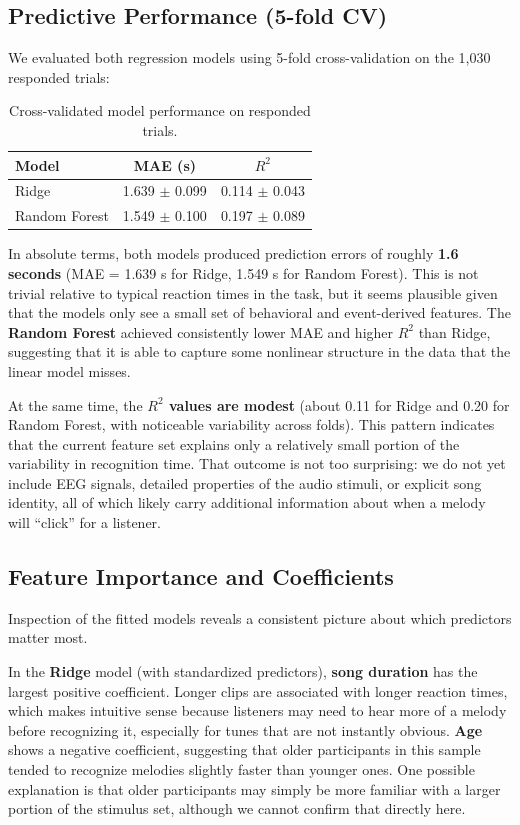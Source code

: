 \documentclass[11pt,a4paper]{article}
\begin{document}
\subsection{Predictive Performance (5-fold CV)}

We evaluated both regression models using 5-fold cross-validation on the 1,030 responded trials:

\begin{table}[h!]
\centering
\begin{tabular}{lcc}
\toprule
\textbf{Model} & \textbf{MAE (s)} & \textbf{$R^2$} \\
\midrule
Ridge & 1.639 $\pm$ 0.099 & 0.114 $\pm$ 0.043 \\
Random Forest & 1.549 $\pm$ 0.100 & 0.197 $\pm$ 0.089 \\
\bottomrule
\end{tabular}
\caption{Cross-validated model performance on responded trials.}
\end{table}

In absolute terms, both models produced prediction errors of roughly \textbf{1.6 seconds} (MAE = 1.639 s for Ridge, 1.549 s for Random Forest). This is not trivial relative to typical reaction times in the task, but it seems plausible given that the models only see a small set of behavioral and event-derived features. The \textbf{Random Forest} achieved consistently lower MAE and higher $R^2$ than Ridge, suggesting that it is able to capture some nonlinear structure in the data that the linear model misses.

At the same time, the \textbf{$R^2$ values are modest} (about 0.11 for Ridge and 0.20 for Random Forest, with noticeable variability across folds). This pattern indicates that the current feature set explains only a relatively small portion of the variability in recognition time. That outcome is not too surprising: we do not yet include EEG signals, detailed properties of the audio stimuli, or explicit song identity, all of which likely carry additional information about when a melody will ``click'' for a listener.

\subsection{Feature Importance and Coefficients}

Inspection of the fitted models reveals a consistent picture about which predictors matter most.

In the \textbf{Ridge} model (with standardized predictors), \textbf{song duration} has the largest positive coefficient. Longer clips are associated with longer reaction times, which makes intuitive sense because listeners may need to hear more of a melody before recognizing it, especially for tunes that are not instantly obvious. \textbf{Age} shows a negative coefficient, suggesting that older participants in this sample tended to recognize melodies slightly faster than younger ones. One possible explanation is that older participants may simply be more familiar with a larger portion of the stimulus set, although we cannot confirm that directly here.
\end{document}
